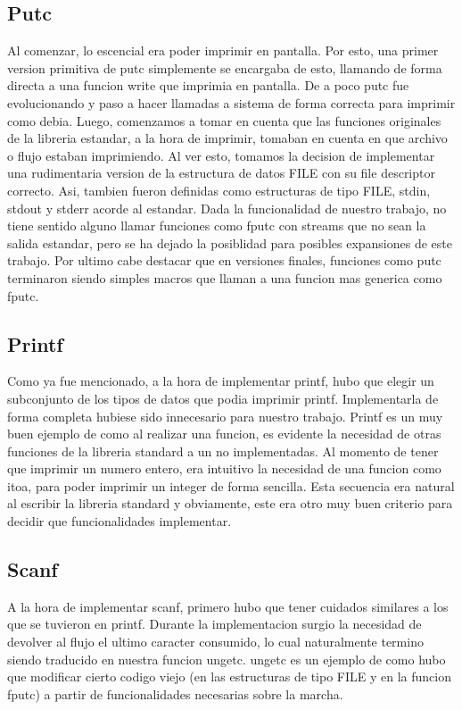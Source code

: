 \documentclass[a4paper,10pt]{article}
\begin{document}
    \subsection{Putc}
        Al comenzar, lo escencial era poder imprimir en pantalla. Por esto, una primer version primitiva de putc simplemente se encargaba de esto, llamando de forma directa a una funcion write que imprimia en pantalla. De a poco putc fue evolucionando y paso a hacer llamadas a sistema de forma correcta para imprimir como debia.
        Luego, comenzamos a tomar en cuenta que las funciones originales de la libreria estandar, a la hora de imprimir, tomaban en cuenta en que archivo o flujo estaban imprimiendo. Al ver esto, tomamos la decision de implementar una rudimentaria version de la estructura de datos FILE con su file descriptor correcto. Asi, tambien fueron definidas como estructuras de tipo FILE, stdin, stdout y stderr acorde al estandar. Dada la funcionalidad de nuestro trabajo, no tiene sentido alguno llamar funciones como fputc con streams que no sean la salida estandar, pero se ha dejado la posiblidad para posibles expansiones de este trabajo.
        Por ultimo cabe destacar que en versiones finales, funciones como putc terminaron siendo simples macros que llaman a una funcion mas generica como fputc.

    \subsection{Printf}
        Como ya fue mencionado, a la hora de implementar printf, hubo que elegir un subconjunto de los tipos de datos que podia imprimir printf. Implementarla de forma completa hubiese sido innecesario para nuestro trabajo. Printf es un muy buen ejemplo de como al realizar una funcion, es evidente la necesidad de otras funciones de la libreria standard a un no implementadas. Al momento de tener que imprimir un numero entero, era intuitivo la necesidad de una funcion como itoa, para poder imprimir un integer de forma sencilla. Esta secuencia era natural al escribir la libreria standard y obviamente, este era otro muy buen criterio para decidir que funcionalidades implementar.

    \subsection{Scanf}    
        A la hora de implementar scanf, primero hubo que tener cuidados similares a los que se tuvieron en printf. Durante la implementacion surgio la necesidad de devolver al flujo el ultimo caracter consumido, lo cual naturalmente termino siendo traducido en nuestra funcion ungetc. ungetc es un ejemplo de como hubo que modificar cierto codigo viejo (en las estructuras de tipo FILE y en la funcion fputc) a partir de funcionalidades necesarias sobre la marcha.
\end{document}
